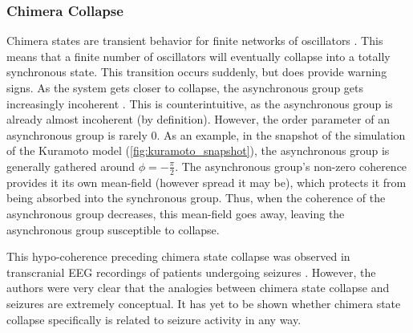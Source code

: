 \subsubsection{Chimera Collapse}
\label{sec:lit_review_chimera_collapse}
Chimera states are transient behavior for finite networks of oscillators \cite{Wolfrum2011}.
This means that a finite number of oscillators will eventually collapse into a totally synchronous state.
This transition occurs suddenly, but does provide warning signs.
As the system gets closer to collapse, the asynchronous group gets increasingly incoherent \cite{Andrzejak2016}.
This is counterintuitive, as the asynchronous group is already almost incoherent (by definition).
However, the order parameter of an asynchronous group is rarely 0.
As an example, in the snapshot of the simulation of the Kuramoto model (\cref{fig:kuramoto_snapshot}), the asynchronous group is generally gathered around $\phi = -\frac{\pi}{2}$.
The asynchronous group's non-zero coherence provides it its own mean-field (however spread it may be), which protects it from being absorbed into the synchronous group.
Thus, when the coherence of the asynchronous group decreases, this mean-field goes away, leaving the asynchronous group susceptible to collapse.

This hypo-coherence preceding chimera state collapse was observed in transcranial EEG recordings of patients undergoing seizures \cite{Andrzejak2016}.
However, the authors were very clear that the analogies between chimera state collapse and seizures are extremely conceptual.
It has yet to be shown whether chimera state collapse specifically is related to seizure activity in any way.

